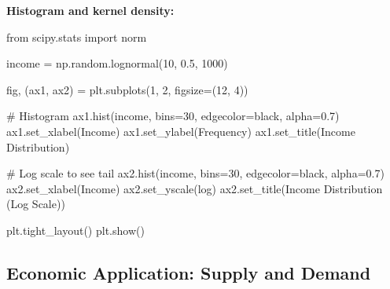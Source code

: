 \documentclass[
  letterpaper,
  DIV=11,
  numbers=noendperiod]{scrartcl}
\newenvironment{Shaded}{\begin{snugshade}}{\end{snugshade}}
\newcommand{\CommentTok}[1]{\textcolor[rgb]{0.37,0.37,0.37}{#1}}
\newcommand{\DecValTok}[1]{\textcolor[rgb]{0.68,0.00,0.00}{#1}}
\newcommand{\FloatTok}[1]{\textcolor[rgb]{0.68,0.00,0.00}{#1}}
\newcommand{\ImportTok}[1]{\textcolor[rgb]{0.00,0.46,0.62}{#1}}
\newcommand{\NormalTok}[1]{\textcolor[rgb]{0.00,0.23,0.31}{#1}}
\newcommand{\OperatorTok}[1]{\textcolor[rgb]{0.37,0.37,0.37}{#1}}
\newcommand{\StringTok}[1]{\textcolor[rgb]{0.13,0.47,0.30}{#1}}
\begin{document}
\textbf{Histogram and kernel density:}

\begin{Shaded}
\begin{Highlighting}[]
\ImportTok{from}\NormalTok{ scipy.stats }\ImportTok{import}\NormalTok{ norm}

\NormalTok{income }\OperatorTok{=}\NormalTok{ np.random.lognormal(}\DecValTok{10}\NormalTok{, }\FloatTok{0.5}\NormalTok{, }\DecValTok{1000}\NormalTok{)}

\NormalTok{fig, (ax1, ax2) }\OperatorTok{=}\NormalTok{ plt.subplots(}\DecValTok{1}\NormalTok{, }\DecValTok{2}\NormalTok{, figsize}\OperatorTok{=}\NormalTok{(}\DecValTok{12}\NormalTok{, }\DecValTok{4}\NormalTok{))}

\CommentTok{\# Histogram}
\NormalTok{ax1.hist(income, bins}\OperatorTok{=}\DecValTok{30}\NormalTok{, edgecolor}\OperatorTok{=}\StringTok{\textquotesingle{}black\textquotesingle{}}\NormalTok{, alpha}\OperatorTok{=}\FloatTok{0.7}\NormalTok{)}
\NormalTok{ax1.set\_xlabel(}\StringTok{\textquotesingle{}Income\textquotesingle{}}\NormalTok{)}
\NormalTok{ax1.set\_ylabel(}\StringTok{\textquotesingle{}Frequency\textquotesingle{}}\NormalTok{)}
\NormalTok{ax1.set\_title(}\StringTok{\textquotesingle{}Income Distribution\textquotesingle{}}\NormalTok{)}

\CommentTok{\# Log scale to see tail}
\NormalTok{ax2.hist(income, bins}\OperatorTok{=}\DecValTok{30}\NormalTok{, edgecolor}\OperatorTok{=}\StringTok{\textquotesingle{}black\textquotesingle{}}\NormalTok{, alpha}\OperatorTok{=}\FloatTok{0.7}\NormalTok{)}
\NormalTok{ax2.set\_xlabel(}\StringTok{\textquotesingle{}Income\textquotesingle{}}\NormalTok{)}
\NormalTok{ax2.set\_yscale(}\StringTok{\textquotesingle{}log\textquotesingle{}}\NormalTok{)}
\NormalTok{ax2.set\_title(}\StringTok{\textquotesingle{}Income Distribution (Log Scale)\textquotesingle{}}\NormalTok{)}

\NormalTok{plt.tight\_layout()}
\NormalTok{plt.show()}
\end{Highlighting}
\end{Shaded}

\subsection{Economic Application: Supply and
Demand}\label{economic-application-supply-and-demand}
\end{document}
